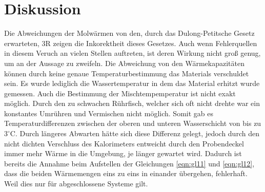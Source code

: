 \section{Diskussion}
\label{sec:Diskussion}
Die Abweichungen der Molwärmen von den, durch das Dulong-Petitsche Gesetz erwarteten, 3R zeigen die Inkorektheit dieses Gesetzes.
Auch wenn Fehlerquellen in diesem Veruch an vielen Stellen auftreten, ist deren Wirkung nicht groß genug, um an der Aussage zu zweifeln.
Die Abweichung von den Wärmekapazitäten können durch keine genaue Temperaturbestimmung das Materials verschuldet sein.
Es wurde lediglich die Wassertemperatur in dem das Material erhitzt wurde gemessen.
Auch die Bestimmung der Mischtempemperatur ist nicht exakt möglich.
Durch den zu schwachen Rührfisch, welcher sich oft nicht drehte war ein konstantes Umrühren und Vermischen nicht möglich.
Somit gab es Temperaturdifferenzen zwischen der oberen und unteren Wasserschicht von bis zu $3^\circ$C.
Durch längeres Abwarten hätte sich diese Differenz gelegt, jedoch durch den nicht dichten Verschluss des Kalorimeters entweicht durch den Probendeckel immer mehr Wärme in die Umgebung, je länger gewartet wird.
Dadurch ist bereits die Annahme beim Aufstellen der Gleichungen \eqref{eqn:gl11} und \eqref{eqn:gl12}, dass die beiden Wärmemengen eins zu eins in einander übergehen, fehlerhaft.
Weil dies nur für abgeschlossene Systeme gilt.
